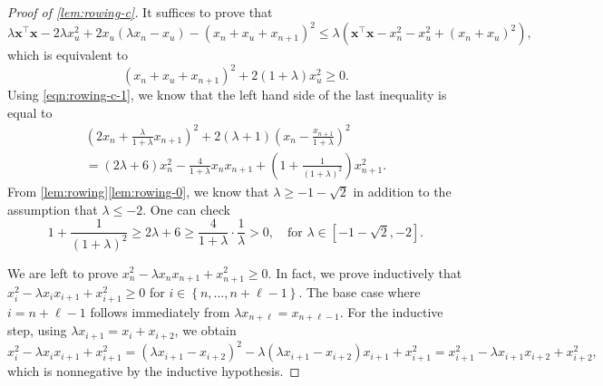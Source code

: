\documentclass[11pt]{article}
\theoremstyle{definition}
\theoremstyle{remark}
\newcommand{\sset}[1]{\left\{{#1}\right\}}
\newcommand{\la}{\lambda}
\newcommand{\bx}{\bm{x}}
\begin{document}
\begin{proof}[Proof of \ref{lem:rowing-c}]
    It suffices to prove that
    \[
    \la \bx^\intercal \bx - 2\la x_u^2 + 2x_u(\la x_n - x_u) - (x_n + x_u + x_{n+1})^2 \le \la\left( \bx^\intercal \bx - x_n^2 - x_u^2 + (x_n + x_u)^2 \right),
    \]
    which is equivalent to
    \[
        (x_n+x_u+x_{n+1})^2 + 2(1+\la)x_u^2 \ge 0.
    \]
    Using \eqref{eqn:rowing-c-1}, we know that the left hand side of the last inequality is equal to
    \begin{multline*}
        \left(2x_n + \frac{\la}{1+\la}x_{n+1}\right)^2 + 2(\la+1)\left(x_n-\frac{x_{n+1}}{1+\la}\right)^2 \\
        = (2\la + 6)x_n^2 - \frac{4}{1+\la}x_nx_{n+1}+\left(1+\frac{1}{(1+\la)^2}\right)x_{n+1}^2.
    \end{multline*}
    From \cref{lem:rowing}\ref{lem:rowing-0}, we know that $\la \ge -1-\sqrt{2}$ in addition to the assumption that $\la \le -2$. One can check
    \[
        1 + \frac{1}{(1+\la)^2} \ge 2\la + 6 \ge \frac{4}{1+\la}\cdot \frac{1}{\la} > 0, \quad \text{for }\la \in [-1-\sqrt2,-2].
    \]
    
    We are left to prove $x_n^2 - \la x_nx_{n+1} + x_{n+1}^2 \ge 0$. In fact, we prove inductively that $x_i^2 - \la x_ix_{i+1} + x_{i+1}^2 \ge 0$ for $i \in \sset{n, \dots, n + \ell - 1}$. The base case where $i = n + \ell - 1$ follows immediately from $\la x_{n+\ell} = x_{n+\ell-1}$. For the inductive step, using $\la x_{i+1} = x_i + x_{i+2}$, we obtain
    \[
        x_i^2 - \la x_i x_{i+1} + x_{i+1}^2 = (\la x_{i+1}-x_{i+2})^2 - \la (\la x_{i+1}-x_{i+2})x_{i+1} + x_{i+1}^2 = x_{i+1}^2 - \la x_{i+1}x_{i+2} + x_{i+2}^2,
    \]
    which is nonnegative by the inductive hypothesis.
\end{proof}
\end{document}
